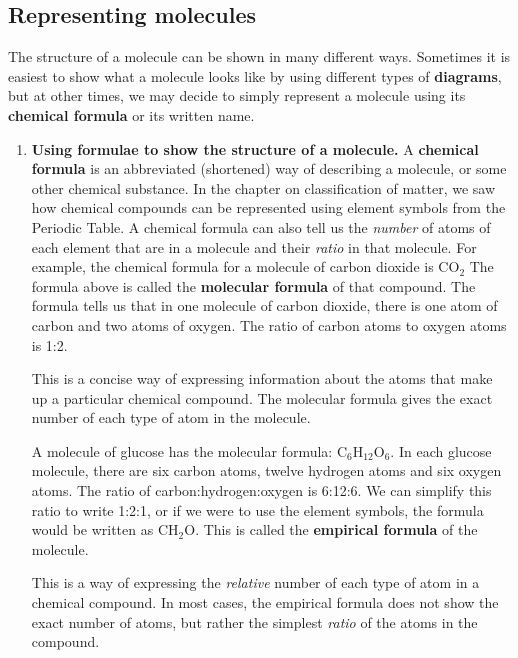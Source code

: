             \subsection*{Representing molecules}
            \nopagebreak
        \label{m38120*id307557}The structure of a molecule can be shown in many 
different ways. Sometimes it is easiest to show what a molecule looks like by 
using different types of \textbf{diagrams}, but at 
other times, we may decide to simply represent a molecule using its \textbf{chemical formula} or its written name.\par 
        \label{m38120*id307573}\begin{enumerate}[noitemsep, label=\textbf{\arabic*}. ] 
            \label{m38120*uid2}\item \textbf{Using formulae to show the structure of a 
molecule.}
A \textbf{chemical formula} is an abbreviated 
(shortened) way of describing a molecule, or some other chemical substance. In 
the chapter on classification of matter, we saw how chemical compounds can be 
represented using element symbols from the Periodic Table. A chemical formula 
can also tell us the \textsl{number} of atoms of 
each element that are in a molecule and their \textsl{ratio} in that molecule.
For example, the chemical formula for a molecule of carbon dioxide is
${\mathrm{CO}}_{2}$
The formula above is called the \textbf{molecular 
formula} of that compound. The formula tells us that in one molecule 
of carbon dioxide, there is one atom of carbon and two atoms of oxygen. The 
ratio of carbon atoms to oxygen atoms is 1:2.
\vspace{\rubberspace}\par
        \label{m38120*fhsst!!!underscore!!!id87}
  { \label{m38120*meaningfhsst!!!underscore!!!id87}
This is a concise way of expressing information about the atoms that make up a 
particular chemical compound. The molecular formula gives the exact number of 
each type of atom in the molecule. 
 } 

A molecule of glucose has the molecular formula:
${\mathrm{C}}_{6}{\mathrm{H}}_{12}{\mathrm{O}}_{6}$.
In each glucose molecule, there are six carbon atoms, twelve hydrogen atoms and 
six oxygen atoms. The ratio of carbon:hydrogen:oxygen is 6:12:6. We can simplify 
this ratio to write 1:2:1, or if we were to use the element symbols, the formula 
would be written as ${\mathrm{CH}}_{2}\mathrm{O}$. This is called the \textbf{empirical formula} of the molecule.
\vspace{\rubberspace}\par
        \label{m38120*fhsst!!!underscore!!!id93}
 { \label{m38120*meaningfhsst!!!underscore!!!id93}
This is a way of expressing the \textsl{relative} 
number of each type of atom in a chemical compound. In most cases, the empirical 
formula does not show the exact number of atoms, but rather the simplest 
\textsl{ratio} of the atoms in the compound. 
 } 


\end{enumerate}
